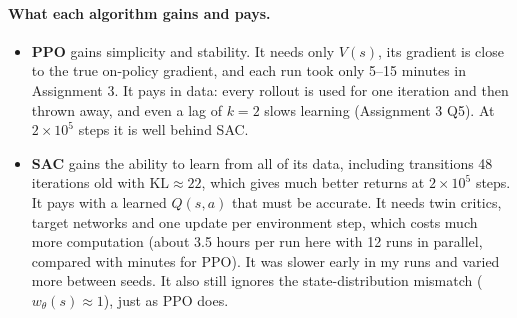 \documentclass[11pt]{article}
\begin{document}
\paragraph{What each algorithm gains and pays.}
\begin{itemize}[nosep]
  \item \textbf{PPO} gains simplicity and stability. It needs only $V(s)$, its gradient is close to the true on-policy
        gradient, and each run took only 5--15 minutes in Assignment 3. It pays in data: every rollout is used for one
        iteration and then thrown away, and even a lag of $k=2$ slows learning (Assignment 3 Q5). At $2\times10^5$ steps it
        is well behind SAC.
  \item \textbf{SAC} gains the ability to learn from all of its data, including transitions 48 iterations old with
        $\mathrm{KL}\approx22$, which gives much better returns at $2\times10^5$ steps. It pays with a learned
        $Q(s,a)$ that must be accurate. It needs twin critics, target networks and one update per environment step, which costs much more
        computation (about 3.5 hours per run here with 12 runs in parallel, compared with minutes for PPO). It was
        slower early in my runs and varied more between seeds. It also still ignores the state-distribution mismatch
        ($w_\theta(s)\approx1$), just as PPO does.
\end{itemize}
\end{document}

